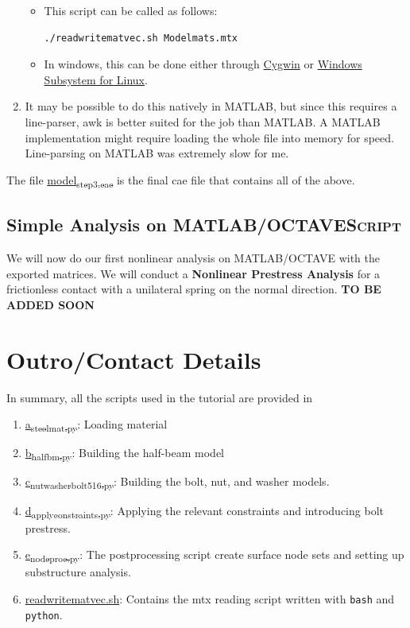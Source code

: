 \documentclass[11pt]{article}
\begin{document}
\begin{enumerate}
\begin{itemize}
\item This script can be called as follows:
\begin{verbatim}
./readwritematvec.sh Modelmats.mtx
\end{verbatim}
\item In windows, this can be done either through \href{https://www.cygwin.com/}{Cygwin} or \href{https://learn.microsoft.com/en-us/windows/wsl/install}{Windows Subsystem for Linux}.
\end{itemize}
\item It may be possible to do this natively in MATLAB, but since this requires a line-parser, awk is better suited for the job than MATLAB.
A MATLAB implementation might require loading the whole file into memory for speed.
Line-parsing on MATLAB was extremely slow for me.
\end{enumerate}
The file \href{https://github.com/Nidish96/Abaqus4Joints/blob/main/assets/assembly/model\_step3.cae}{model\textsubscript{step3.cae}} is the final cae file that contains all of the above.
\subsection{Simple Analysis on MATLAB/OCTAVE\hfill{}\textsc{Script}}
\label{sec:orga5cd17a}
We will now do our first nonlinear analysis on MATLAB/OCTAVE with the exported matrices.
We will conduct a \textbf{Nonlinear Prestress Analysis} for a frictionless contact with a unilateral spring on the normal direction.
\textbf{TO BE ADDED SOON}

\section{Outro/Contact Details}
\label{sec:orge06dbae}
In summary, all the scripts used in the tutorial are provided in 
\begin{enumerate}
\item \href{https://github.com/Nidish96/Abaqus4Joints/blob/main/scripts/a\_steelmat.py}{a\textsubscript{steelmat.py}}: Loading material
\item \href{https://github.com/Nidish96/Abaqus4Joints/blob/main/scripts/b\_halfbm.py}{b\textsubscript{halfbm.py}}: Building the half-beam model
\item \href{https://github.com/Nidish96/Abaqus4Joints/blob/main/scripts/c\_nutwasherbolt\_516.py}{c\textsubscript{nutwasherbolt}\textsubscript{516.py}}: Building the bolt, nut, and washer models.
\item \href{https://github.com/Nidish96/Abaqus4Joints/blob/main/scripts/d\_applyconstraints.py}{d\textsubscript{applyconstraints.py}}: Applying the relevant constraints and introducing bolt prestress.
\item \href{https://github.com/Nidish96/Abaqus4Joints/blob/main/scripts/e\_nodeproc.py}{e\textsubscript{nodeproc.py}}: The postprocessing script create surface node sets and setting up substructure analysis.
\item \href{https://github.com/Nidish96/Abaqus4Joints/blob/main/scripts/readwritematvec.sh}{readwritematvec.sh}: Contains the mtx reading script written with \texttt{bash} and \texttt{python}.
\end{enumerate}
\end{document}
